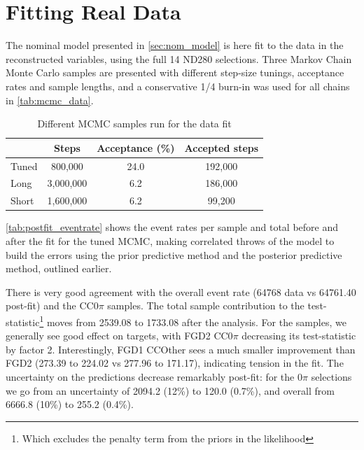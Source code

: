 \section{Fitting Real Data}
\label{sec:datafit}
The nominal model presented in \autoref{sec:nom_model} is here fit to the data in the reconstructed \pmu \cosmu variables, using the full 14 ND280 selections. Three Markov Chain Monte Carlo samples are presented with different step-size tunings, acceptance rates and sample lengths, and a conservative 1/4 burn-in was used for all chains in \autoref{tab:mcmc_data}.
\begin{table}[h]
	\centering
	\begin{tabular}{l | c c c}
		\hline \hline
					& Steps		& Acceptance (\%) & Accepted steps \\
		\hline
		Tuned			& 800,000		& 24.0 	& 192,000 \\
		Long			& 3,000,000		& 6.2 	& 186,000 \\
		Short			& 1,600,000		& 6.2 	& 99,200 \\
		\hline \hline
	\end{tabular}
\caption{Different MCMC samples run for the data fit}
\label{tab:mcmc_data}
\end{table}

\autoref{tab:postfit_eventrate} shows the event rates per sample and total before and after the fit for the tuned MCMC, making correlated throws of the model to build the errors using the prior predictive method and the posterior predictive method, outlined earlier. 

There is very good agreement with the overall event rate (64768 data vs 64761.40 post-fit) and the CC0$\pi$ samples. The total sample contribution to the test-statistic\footnote{Which excludes the penalty term from the priors in the likelihood} moves from 2539.08 to 1733.08 after the analysis. For the samples, we generally see good effect on targets, with FGD2 CC0$\pi$ decreasing its test-statistic by factor 2. Interestingly, FGD1 CCOther sees a much smaller improvement than FGD2 (273.39 to 224.02 vs 277.96 to 171.17), indicating tension in the fit. The uncertainty on the predictions decrease remarkably post-fit: for the 0$\pi$ selections we go from an uncertainty of 2094.2 (12\%) to 120.0 (0.7\%), and overall from 6666.8 (10\%) to 255.2 (0.4\%). 

